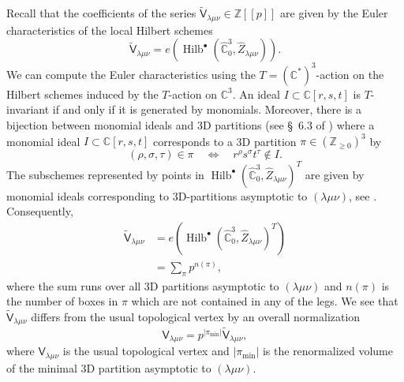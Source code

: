\documentclass[12pt]{amsart}
\theoremstyle{definition}
\newcommand{\CC} {\mathbb{C}}          %
\newcommand{\ZZ} {\mathbb{Z}}		%
\newcommand{\sfV}{\mathsf{V}}
\newcommand{\sfVtilde}{\widetilde{\mathsf{V}}}
\newcommand{\Hilb}{\operatorname{Hilb}}
\renewcommand{\hat}{\widehat}
\begin{document}
Recall that the coefficients of the series $\sfVtilde_{\lambda \mu \nu}\in \ZZ [[p]]$ are
given by the Euler characteristics of the local Hilbert schemes
\[
\sfVtilde_{\lambda \mu \nu} =
e\left(\Hilb^{\bullet}(\hat{\CC}^{3}_{0},\hat{Z}_{\lambda \mu \nu})
\right). 
\]
We can compute the Euler characteristics using the $T=(\CC^{*})^{3}$-action on the Hilbert schemes induced by the $T$-action on
$\CC^{3}$. An ideal $I\subset \CC [r,s,t]$ is $T$-invariant if and
only if it is generated by monomials. Moreover, there is a bijection
between monomial ideals and 3D partitions (see \S~6.3 of
\cite{Bryan-Kool-Young}) where a monomial ideal $I\subset \CC[r,s,t]$
corresponds to a 3D partition $\pi \in \left(\ZZ_{\geq 0} \right)^{3}$
by
\[
(\rho ,\sigma ,\tau )\in \pi  \quad \Longleftrightarrow\quad 
r^{\rho}s^{\sigma}t^{\tau} \notin I.
\]
The subschemes represented by points in
$\Hilb^{\bullet}(\hat{\CC}^{3}_{0},\hat{Z}_{\lambda \mu \nu}
)^{T}$ are given by monomial ideals corresponding to 3D-partitions
asymptotic to $(\lambda \mu \nu )$, see
\cite[Defn~1]{Bryan-Kool-Young}. Consequently, 
\begin{align*}
\sfVtilde_{\lambda \mu \nu}& = e\left(\Hilb^{\bullet}(\hat{\CC}^{3}_{0},\hat{Z}_{\lambda \mu \nu} )^{T}\right)\\
&=\sum_{\pi} p^{n(\pi )},
\end{align*}
where the sum runs over all 3D partitions asymptotic to $(\lambda \mu
\nu )$ and $n(\pi )$ is the number of boxes in $\pi$ which are not
contained in any of the legs. We see that $\sfVtilde_{\lambda \mu
\nu}$ differs from the usual topological vertex by an overall
normalization
\[
\sfV_{\lambda \mu \nu} = p^{|\pi_{\min}|} \sfVtilde_{\lambda \mu \nu},
\]
where $\sfV_{\lambda \mu \nu }$ is the usual topological vertex
\cite[Defn~2]{Bryan-Kool-Young} and $|\pi_{\min}|$ is the renormalized
volume \cite[page~2]{Bryan-Kool-Young} of the minimal 3D partition asymptotic to $(\lambda \mu \nu )$.  
\end{document}
